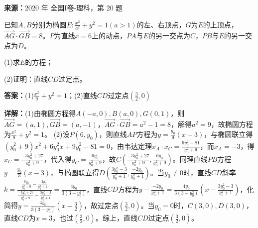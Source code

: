 \begin{question}[points=12]
\textbf{来源：}2020 年 全国I卷-理科，第 20 题\par
已知$A,B$分别为椭圆$E:\frac{x^2}{a^2}+y^2=1(a>1)$的左、右顶点，$G$为$E$的上顶点，$\overrightarrow{AG}\cdot\overrightarrow{GB}=8$。$P$为直线$x=6$上的动点，$PA$与$E$的另一交点为$C$，$PB$与$E$的另一交点为$D$。

(1)求$E$的方程；

(2)证明：直线$CD$过定点。
\begin{solution}
\textbf{答案：}(1)$\frac{x^2}{9}+y^2=1$；(2)直线$CD$过定点$\left(\frac{3}{2},0\right)$

\textbf{详解：}(1)由椭圆方程得$A(-a,0),B(a,0),G(0,1)$，则$\overrightarrow{AG}=(a,1),\overrightarrow{GB}=(a,-1)$，$\overrightarrow{AG}\cdot\overrightarrow{GB}=a^2-1=8$，解得$a^2=9$，故椭圆方程为$\frac{x^2}{9}+y^2=1$。
(2)设$P(6,y_0)$，则直线$AP$方程为$y=\frac{y_0}{9}(x+3)$，与椭圆联立得$(y_0^2+9)x^2+6y_0^2x+9y_0^2-81=0$，由韦达定理$x_A\cdot x_C=\frac{9y_0^2-81}{y_0^2+9}$，而$x_A=-3$，得$x_C=\frac{-3y_0^2+27}{y_0^2+9}$，代入得$y_C=\frac{6y_0}{y_0^2+9}$，故$C\left(\frac{-3y_0^2+27}{y_0^2+9},\frac{6y_0}{y_0^2+9}\right)$。同理直线$PB$方程$y=\frac{y_0}{3}(x-3)$，与椭圆联立得$D\left(\frac{3y_0^2-3}{y_0^2+1},\frac{-2y_0}{y_0^2+1}\right)$。当$y_0\neq0$时，直线$CD$斜率$k=\frac{\frac{6y_0}{y_0^2+9}-\frac{-2y_0}{y_0^2+1}}{\frac{-3y_0^2+27}{y_0^2+9}-\frac{3y_0^2-3}{y_0^2+1}}=\frac{4y_0}{3(3-y_0^2)}$，直线$CD$方程为$y-\frac{-2y_0}{y_0^2+1}=\frac{4y_0}{3(3-y_0^2)}\left(x-\frac{3y_0^2-3}{y_0^2+1}\right)$，化简得$y=\frac{4y_0}{3(3-y_0^2)}\left(x-\frac{3}{2}\right)$，故过定点$\left(\frac{3}{2},0\right)$。当$y_0=0$时，$C(3,0),D(3,0)$，直线$CD$为$x=3$，也过$\left(\frac{3}{2},0\right)$。综上，直线$CD$过定点$\left(\frac{3}{2},0\right)$。
\end{solution}
\end{question}

